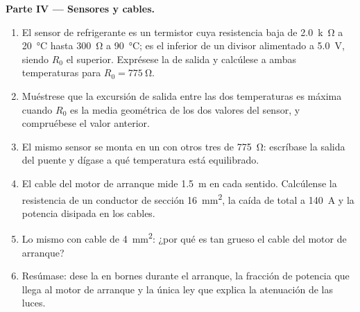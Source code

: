 \begin{problem}
\medskip
\noindent\textbf{Parte IV --- Sensores y cables.}
\begin{enumerate}[resume]
  \item El sensor de refrigerante es un termistor cuya resistencia baja de
        \qty{2.0}{k\ohm} a \qty{20}{\degreeCelsius} hasta \qty{300}{\ohm} a
        \qty{90}{\degreeCelsius}; es el  inferior de un divisor
        alimentado a \qty{5.0}{V}, siendo $R_0$ el superior. Exprésese la
         de salida y calcúlese a ambas temperaturas para
        $R_0 = \qty{775}{\ohm}$.
  \item Muéstrese que la excursión de salida entre las dos temperaturas es
        máxima cuando $R_0$ es la media geométrica de los dos valores del
        sensor, y compruébese el valor anterior.
  \item El mismo sensor se monta en un  con otros tres
         de \qty{775}{\ohm}: escríbase la salida del puente y
        dígase a qué temperatura está equilibrado.
  \item El cable del motor de arranque mide \qty{1.5}{m} en cada sentido.
        Calcúlense la resistencia de un conductor de sección
        \qty{16}{mm^2}, la caída de  total a \qty{140}{A} y la
        potencia disipada en los cables.
  \item Lo mismo con cable de \qty{4}{mm^2}: ¿por qué es tan grueso el
        cable del motor de arranque?
  \item Resúmase: dese la  en bornes durante el arranque, la
        fracción de potencia que llega al motor de arranque y la única ley
        que explica la atenuación de las luces.
\end{enumerate}
\end{problem}
